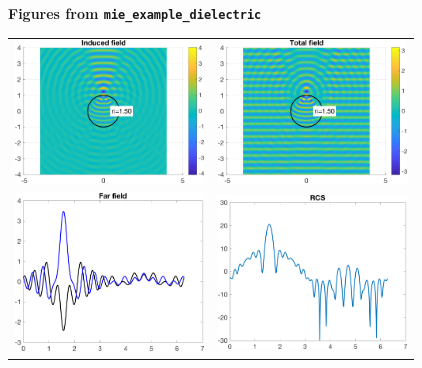 \documentclass[11pt,letterpaper]{article}
\newcommand{\techheading}[1]{%
    \par\vspace{-0.3\parskip}\noindent\hspace{-1cm}\textbf{#1}%
    \par\vspace{-0.5\parskip}\noindent\nopagebreak\ignorespaces}
\begin{document}
\newpage 
\techheading{Figures from \texttt{mie\_example\_dielectric}}
\begin{center}
  \begin{tabular}{cc}
    \includegraphics[width=5cm]{mie_example_dielectric_figure1.png}
    &
    \includegraphics[width=5cm]{mie_example_dielectric_figure2.png}\\
    \includegraphics[width=5cm]{mie_example_dielectric_figure3.png}
    &
    \includegraphics[width=5cm]{mie_example_dielectric_figure4.png}
  \end{tabular}
\end{center}
\end{document}
